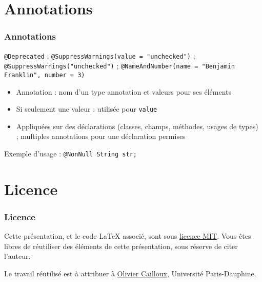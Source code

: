 \documentclass[english, french]{beamer}
\begin{document}
\section{Annotations}
\begin{frame}
	\frametitle{Annotations}
	\texttt{@Deprecated} ; \texttt{@SuppressWarnings(value = "unchecked")} ; \texttt{@SuppressWarnings("unchecked")} ; \texttt{@NameAndNumber(name = "Benjamin Franklin", number = 3)}
	\begin{itemize}
		\item Annotation : nom d’un type annotation et valeurs pour ses éléments
		\item Si seulement une valeur : utilisée pour \texttt{value}
		\item Appliquées sur des déclarations (classes, champs, méthodes, usages de types) ; multiples annotations pour une déclaration permises
	\end{itemize}
	Exemple d’usage : \texttt{@NonNull String str;}
\end{frame}

\appendix
\section{Licence}
\begin{frame}
	\frametitle{Licence}
	Cette présentation, et le code LaTeX associé, sont sous \href{https://opensource.org/licenses/MIT}{licence MIT}. Vous êtes libres de réutiliser des éléments de cette présentation, sous réserve de citer l’auteur.
	
	Le travail réutilisé est à attribuer à \href{https://www.lamsade.dauphine.fr/~ocailloux/}{Olivier Cailloux}, Université Paris-Dauphine.
\end{frame}
\end{document}
